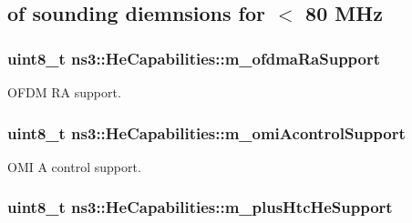 \subsection*{of sounding diemnsions for $<$ 80 M\+Hz}

\subsubsection[{\texorpdfstring{m\+\_\+ofdma\+Ra\+Support}{m_ofdmaRaSupport}}]{\setlength{\rightskip}{0pt plus 5cm}uint8\+\_\+t ns3\+::\+He\+Capabilities\+::m\+\_\+ofdma\+Ra\+Support\hspace{0.3cm}{\ttfamily [private]}}\hypertarget{classns3_1_1HeCapabilities_a5ea71c2d79607f3708c739af0c03fde7}{}\label{classns3_1_1HeCapabilities_a5ea71c2d79607f3708c739af0c03fde7}


O\+F\+DM RA support. 

\subsubsection[{\texorpdfstring{m\+\_\+omi\+Acontrol\+Support}{m_omiAcontrolSupport}}]{\setlength{\rightskip}{0pt plus 5cm}uint8\+\_\+t ns3\+::\+He\+Capabilities\+::m\+\_\+omi\+Acontrol\+Support\hspace{0.3cm}{\ttfamily [private]}}\hypertarget{classns3_1_1HeCapabilities_a298a39ff42fc92cdb7eabf4dc93212f1}{}\label{classns3_1_1HeCapabilities_a298a39ff42fc92cdb7eabf4dc93212f1}


O\+MI A control support. 

\subsubsection[{\texorpdfstring{m\+\_\+plus\+Htc\+He\+Support}{m_plusHtcHeSupport}}]{\setlength{\rightskip}{0pt plus 5cm}uint8\+\_\+t ns3\+::\+He\+Capabilities\+::m\+\_\+plus\+Htc\+He\+Support\hspace{0.3cm}{\ttfamily [private]}}\hypertarget{classns3_1_1HeCapabilities_aa6a2ca2426a417f0bc5bc7680ec8b4c1}{}\label{classns3_1_1HeCapabilities_aa6a2ca2426a417f0bc5bc7680ec8b4c1}


